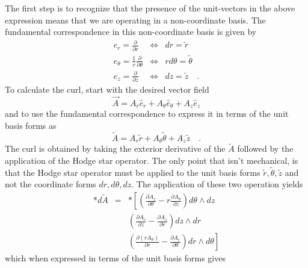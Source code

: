 \documentclass[twocolumn]{article}
\def\.{{\quad .}}
\begin{document}
The first step is to recognize that the presence of the unit-vectors 
in the above expression means that we are operating in a 
non-coordinate basis.  The fundamental correspondence in this 
non-coordinate basis is given by
\begin{eqnarray*}
	{\hat e}_{r} = \frac{\partial}{\partial r} 
	               & \Leftrightarrow &
				   dr = {\tilde r} \\
	{\hat e}_{\theta} = \frac{1}{r} \frac{\partial}
	                                     {\partial \theta}
					& \Leftrightarrow &
				   r d \theta = {\tilde \theta} \\
	{\hat e}_{z} = \frac{\partial}{\partial z}
					& \Leftrightarrow &
        		   dz = {\tilde z} \.
\end{eqnarray*}
To calculate the curl, start with the desired vector field
\[
	{\vec A} =  A_{r} {\hat e}_{r} + A_{\theta} {\hat e}_{\theta}
	          + A_{z} {\hat e}_{z}
\]
and to use the fundamental correspondence to express it in terms of 
the unit basis forms as
\[
	{\tilde A} =  A_{r} {\tilde r} + A_{\theta} {\tilde \theta}
	            + A_{z} {\tilde z} \.
\]
The curl is obtained by taking the exterior derivative of the $\tilde 
A$ followed by the application of the Hodge star operator.  The only 
point that isn't mechanical, is that the Hodge star operator must be 
applied to the unit basis forms $\tilde r, \tilde \theta, \tilde z$ 
and not the coordinate forms $dr, d\theta, dz$.  The application of
these two operation yields
\begin{eqnarray*}
	\ast d {\tilde A} & = & \ast \left[
	                           \left( 
							    \frac{\partial A_z}
								     {\partial \theta}
							    -
								r \frac{\partial A_{\theta}}
								       {\partial z}
							   \right) d\theta \wedge dz 
							   \right. \\
							  & &
							 \left(
							  \frac{\partial A_r}
							       {\partial z}
							 -
							  \frac{\partial A_z}
							       {\partial r}
							 \right) dz \wedge dr \\
							 & &
							 \left.
							 \left(
							  \frac{\partial \left( 
							        r A_{\theta}\right)}
									{\partial r}
							 -
							  \frac{\partial A_r}
							       {\partial \theta} 
							 \right) dr \wedge d \theta
							 \right] 
\end{eqnarray*}
which when expressed in terms of the unit basis forms gives
\end{document}
